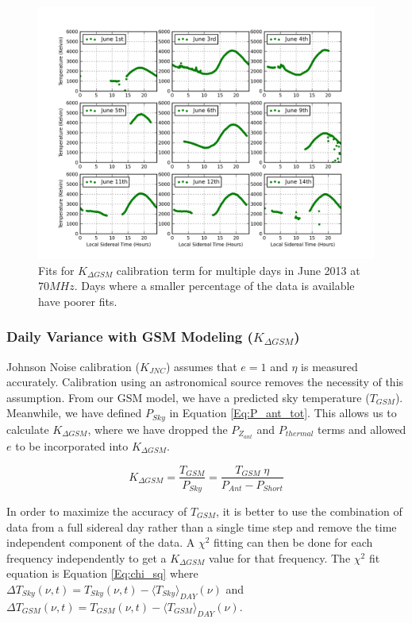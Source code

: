 \begin{figure}[htb]
\begin{center}
\includegraphics[width=0.95\linewidth]{Data_analysis/figures/Combined_Kdgsm_time_series.png}
\caption{Fits for $K_{\Delta GSM}$ calibration term for multiple days in June 2013 at $70 MHz$. Days where a smaller percentage of the data is available have poorer fits. }
\label{Fig:Kdgsm_var}
\end{center}
\end{figure}

\subsubsection{Daily Variance with GSM Modeling ($K_{\Delta GSM}$)}\label{Sec:KGSM}

Johnson Noise calibration ($K_{JNC}$) assumes that $e = 1$ and $\eta$ is measured accurately. Calibration using an astronomical source removes the necessity of this assumption. From our GSM model, we have a predicted sky temperature ($T_{GSM}$). Meanwhile, we have defined $P_{Sky}$ in Equation \ref{Eq:P_ant_tot}. This allows us to calculate $K_{\Delta GSM}$, where we have dropped the $P_{Z_{ant}}$ and $P_{thermal}$ terms and allowed $e$ to be incorporated into $K_{\Delta GSM}$. 

\begin{equation}
K_{\Delta GSM} = \frac{T_{GSM}}{P_{Sky}} = \frac{T_{GSM} \; \eta}{ P_{Ant}-P_{Short}}
\end{equation}

In order to maximize the accuracy of $T_{GSM}$, it is better to use the combination of data from a full sidereal day rather than a single time step and remove the time independent component of the data. A $\chi^2$ fitting can then be done  for each frequency independently to get a $K_{\Delta GSM}$ value for that frequency. The $\chi^2$ fit equation is Equation \ref{Eq:chi_sq} where $\Delta T_{Sky} (\nu, t) = T_{Sky}(\nu,t)-\langle T_{Sky} \rangle_{DAY} (\nu)$ and $\Delta T_{GSM} (\nu,t) = T_{GSM}(\nu,t)-\langle T_{GSM} \rangle_{DAY} (\nu)$. 


